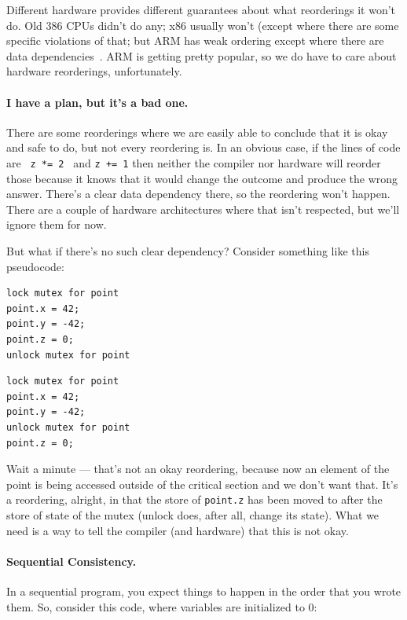 \documentclass[a4paper]{report}
\begin{document}
Different hardware provides different guarantees about what reorderings it won't do. Old 386 CPUs didn't do any; x86 usually won't (except where there are some specific violations of that; but ARM has weak ordering except where there are data dependencies~\cite{weakvsstrong}. ARM is getting pretty popular, so we do have to care about hardware reorderings, unfortunately.

\paragraph{I have a plan, but it's a bad one.}

There are some reorderings where we are easily able to conclude that it is okay and safe to do, but not every reordering is. In an obvious case, if the lines of code are \texttt{ z *= 2 } and \texttt {z += 1} then neither the compiler nor hardware will reorder those because it knows that it would change the outcome and produce the wrong answer. There's a clear data dependency there, so the reordering won't happen. There are a couple of hardware architectures where that isn't respected, but we'll ignore them for now.

But what if there's no such clear dependency? Consider something like this pseudocode:

\begin{multicols}{2}
\begin{verbatim}
lock mutex for point
point.x = 42;
point.y = -42;
point.z = 0;
unlock mutex for point
\end{verbatim}
\columnbreak
\begin{verbatim}
lock mutex for point
point.x = 42;
point.y = -42;
unlock mutex for point
point.z = 0;
\end{verbatim}
\end{multicols}

Wait a minute --- that's not an okay reordering, because now an element of the point is being accessed outside of the critical section and we don't want that. It's a reordering, alright, in that the store of \texttt{point.z} has been moved to after the store of state of the mutex (unlock does, after all, change its state). What we need is a way to tell the compiler (and hardware) that this is not okay.


\paragraph{Sequential Consistency.} In a sequential program, you expect
things to happen in the order that you wrote them. So, consider this code,
where variables are initialized to 0:
\end{document}
